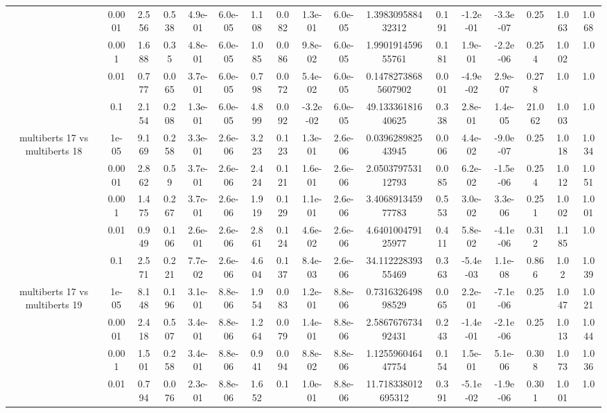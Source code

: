 \begin{tabular}{|c|c|c|c|c|c|c|c|c|c|c|c|c|c|c|c|c|}
 & 0.0001 & 2.556 & 0.538 & 4.9e-01 & 6.0e-05 & 1.108 & 0.082 & 1.3e-01 & 6.0e-05 & 1.398309588432312 & 0.191 & -1.2e-01 & -3.3e-07 & 0.25 & 1.063 & 1.068 \\
 & 0.001 & 1.688 & 0.35 & 4.8e-01 & 6.0e-05 & 1.085 & 0.086 & 9.8e-02 & 6.0e-05 & 1.990191459655761 & 0.181 & 1.9e-01 & -2.2e-06 & 0.254 & 1.002 & 1.0 \\
 & 0.01 & 0.777 & 0.065 & 3.7e-01 & 6.0e-05 & 0.798 & 0.072 & 5.4e-02 & 6.0e-05 & 0.14782738685607902 & 0.001 & -4.9e-02 & 2.9e-07 & 0.278 & 1.0 & 1.0 \\
 & 0.1 & 2.154 & 0.208 & 1.3e-01 & 6.0e-05 & 4.899 & 0.092 & -3.2e-02 & 6.0e-05 & 49.13336181640625 & 0.338 & 2.8e-01 & 1.4e-05 & 21.062 & 1.003 & 1.0 \\
\hline
\multirow{5}{*}{multiberts 17 vs multiberts 18} & 1e-05 & 9.169 & 0.258 & 3.3e-01 & 2.6e-06 & 3.223 & 0.123 & 1.3e-01 & 2.6e-06 & 0.039628982543945 & 0.006 & 4.4e-02 & -9.0e-07 & 0.25 & 1.018 & 1.034 \\
 & 0.0001 & 2.862 & 0.59 & 3.7e-01 & 2.6e-06 & 2.424 & 0.121 & 1.6e-01 & 2.6e-06 & 2.050379753112793 & 0.085 & 6.2e-02 & -1.5e-06 & 0.254 & 1.012 & 1.051 \\
 & 0.001 & 1.475 & 0.267 & 3.7e-01 & 2.6e-06 & 1.919 & 0.129 & 1.1e-01 & 2.6e-06 & 3.406891345977783 & 0.553 & 3.0e-02 & 3.3e-06 & 0.251 & 1.002 & 1.001 \\
 & 0.01 & 0.949 & 0.106 & 2.6e-01 & 2.6e-06 & 2.861 & 0.124 & 4.6e-02 & 2.6e-06 & 4.640100479125977 & 0.411 & 5.8e-02 & -4.1e-06 & 0.312 & 1.185 & 1.0 \\
 & 0.1 & 2.571 & 0.221 & 7.7e-02 & 2.6e-06 & 4.604 & 0.137 & 8.4e-03 & 2.6e-06 & 34.11222839355469 & 0.363 & -5.4e-03 & 1.1e-08 & 0.866 & 1.02 & 1.039 \\
\hline
\multirow{5}{*}{multiberts 17 vs multiberts 19} & 1e-05 & 8.148 & 0.196 & 3.1e-01 & 8.8e-06 & 1.954 & 0.083 & 1.2e-01 & 8.8e-06 & 0.731632649898529 & 0.065 & 2.2e-01 & -7.1e-06 & 0.25 & 1.047 & 1.021 \\
 & 0.0001 & 2.418 & 0.507 & 3.4e-01 & 8.8e-06 & 1.264 & 0.079 & 1.4e-01 & 8.8e-06 & 2.586767673492431 & 0.243 & -1.4e-01 & -2.1e-06 & 0.25 & 1.013 & 1.044 \\
 & 0.001 & 1.501 & 0.258 & 3.4e-01 & 8.8e-06 & 0.941 & 0.094 & 8.8e-02 & 8.8e-06 & 1.125596046447754 & 0.154 & 1.5e-01 & 5.1e-06 & 0.308 & 1.073 & 1.036 \\
 & 0.01 & 0.794 & 0.076 & 2.3e-01 & 8.8e-06 & 1.652 & 0.1 & 1.0e-01 & 8.8e-06 & 11.718338012695312 & 0.391 & -5.1e-02 & -1.9e-06 & 0.301 & 1.001 & 1.0 \\

\end{tabular}
